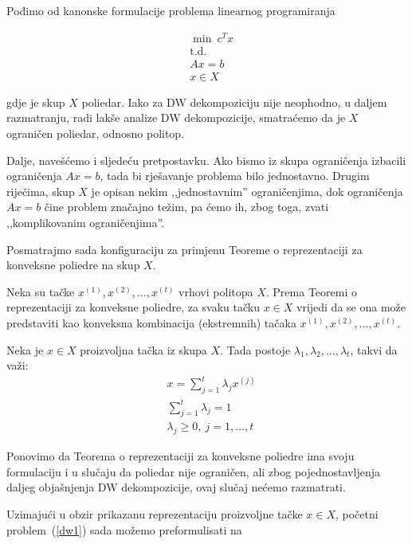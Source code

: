 \documentclass[a4paper, utf8, 11pt, colorlinks]{book}
\theoremstyle{definition}
\begin{document}
 Pođimo od kanonske formulacije problema linearnog programiranja
 
  \begin{equation}
 	\begin{aligned}\label{dw1}
 		&\min\ c^Tx\\
 		&\mbox{t.d.}\\
 	 &Ax=b\\
 		&x \in X
 	\end{aligned}
 \end{equation}
 
 gdje je skup $X$ poliedar. Iako za DW dekompoziciju nije neophodno, u daljem razmatranju, radi lakše analize DW dekompozicije, smatraćemo da je $X$ ograničen poliedar, odnosno politop.
 
 Dalje, navešćemo i sljedeću pretpostavku. Ako bismo iz skupa ograničenja izbacili ograničenja $Ax=b$, tada bi rješavanje problema bilo jednostavno. Drugim riječima, skup $X$ je opisan nekim ,,jednostavnim'' ograničenjima, dok ograničenja $Ax=b$ čine problem značajno težim, pa ćemo ih, zbog toga, zvati ,,komplikovanim ograničenjima''. 
 
 Posmatrajmo sada konfiguraciju za primjenu Teoreme o reprezentaciji za konveksne poliedre na skup $X$.
 
 Neka su tačke $x^{(1)},x^{(2)},\dots,x^{(t)}$ vrhovi politopa $X$.  
 Prema Teoremi o reprezentaciji za konveksne poliedre, za svaku tačku $x\in X$ vrijedi da se ona može predstaviti kao konveksna kombinacija (ekstremnih) tačaka $x^{(1)},x^{(2)},\dots,x^{(t)}$.
 
 Neka je  $x \in X$ proizvoljna tačka iz skupa $X$.  Tada postoje $\lambda_1,\lambda_2,\ldots,\lambda_t$, takvi da važi:
 \begin{equation}
 	\begin{aligned}
 		&x = \sum_{j=1}^t\lambda_jx^{(j)}\\
 		 &\sum_{j=1}^t\lambda_j = 1\\
 		&\lambda_j\geqslant 0,\ j = 1,\ldots,t
 	\end{aligned}
 \end{equation}
 
 Ponovimo da Teorema o reprezentaciji za konveksne poliedre ima svoju formulaciju i u slučaju da poliedar nije ograničen, ali zbog pojednostavljenja daljeg objašnjenja DW dekompozicije, ovaj slučaj nećemo razmatrati.
 
 Uzimajući u obzir prikazanu reprezentaciju proizvoljne tačke $x\in X$, početni problem~(\ref{dw1}) sada možemo preformulisati na
 
\end{document}
